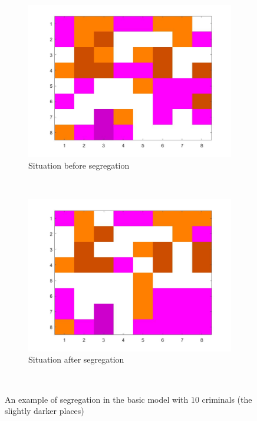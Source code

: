 \begin{figure}[H]
	\centering
    \begin{subfigure}{0.4\textwidth}
        \includegraphics[width=\textwidth]{vb5beginbord.jpg}
        \caption{Situation before segregation}
        \label{fig:example crim begin}
    \end{subfigure}\hspace{0cm}
    ~ 
    \begin{subfigure}{0.4\textwidth}
        \includegraphics[width=\textwidth]{vb5eindbord.jpg}
        \caption{Situation after segregation}
        \label{fig:example crim end}
    \end{subfigure}
    ~ 
    \caption{An example of segregation in the basic model with $10$ criminals (the slightly darker places)}
    \label{fig:examplecrim}
\end{figure}

